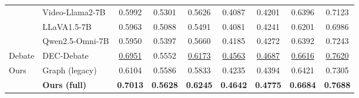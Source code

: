 \documentclass[journal]{IEEEtran}
\begin{document}
\begin{table}[t]
\begin{tabular}{llccccccc}
& Video-Llama2-7B                   & 0.5992 & 0.5301 & 0.5626 & 0.4087 & 0.4201 & 0.6396 & 0.7123 \\
& LLaVA1.5-7B                       & 0.5963 & 0.5088 & 0.5491 & 0.4081 & 0.4241 & 0.6201 & 0.6986 \\
& Qwen2.5-Omni-7B                   & 0.5950 & 0.5397 & 0.5660 & 0.4185 & 0.4272 & 0.6392 & 0.7243 \\
\midrule
\multirow{1}{*}{Debate}
& DEC-Debate \cite{wu2025decdebate} & \underline{0.6951} & 0.5552 & \underline{0.6173} & \underline{0.4563} & \underline{0.4687} & \underline{0.6616} & \underline{0.7620} \\
\midrule
\multirow{2}{*}{Ours}
& Graph (legacy)                    & 0.6104 & 0.5586 & 0.5833 & 0.4235 & 0.4394 & 0.6421 & 0.7305 \\
& \textbf{Ours (full)}              & \textbf{0.7013} & \textbf{0.5628} & \textbf{0.6245} & \textbf{0.4642} & \textbf{0.4775} & \textbf{0.6684} & \textbf{0.7688} \\
\bottomrule
\end{tabular}
\end{table}
\end{document}
